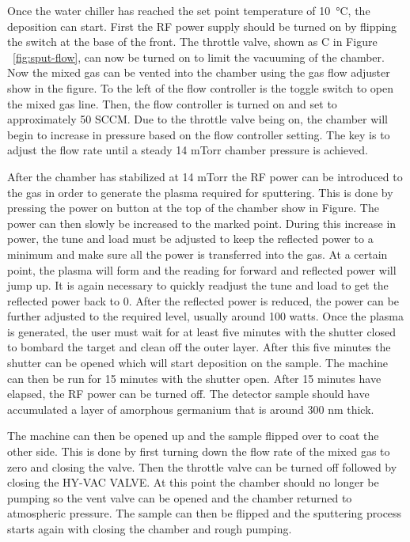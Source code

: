 Once the water chiller has reached the set point temperature of \SI{10}{\celsius}, the deposition can start.
First the RF power supply should be turned on by flipping the switch at the base of the front.
The throttle valve, shown as C in Figure ~\ref{fig:sput-flow}, can now be turned on to limit the vacuuming of the chamber.
Now the mixed gas can be vented into the chamber using the gas flow adjuster show in the figure.
To the left of the flow controller is the toggle switch to open the mixed gas line.
Then, the flow controller is turned on and set to approximately 50 SCCM.
Due to the throttle valve being on, the chamber will begin to increase in pressure based on the flow controller setting.
The key is to adjust the flow rate until a steady 14 mTorr chamber pressure is achieved.

After the chamber has stabilized at 14 mTorr the RF power can be introduced to the gas in order to generate the plasma required for sputtering.
This is done by pressing the power on button at the top of the chamber show in Figure.
The power can then slowly be increased to the marked point.
During this increase in power, the tune and load must be adjusted to keep the reflected power to a minimum and make sure all the power is transferred into the gas.
At a certain point, the plasma will form and the reading for forward and reflected power will jump up.
It is again necessary to quickly readjust the tune and load to get the reflected power back to 0.
After the reflected power is reduced, the power can be further adjusted to the required level, usually around 100 watts.
Once the plasma is generated, the user must wait for at least five minutes with the shutter closed to bombard the target and clean off the outer layer.
After this five minutes the shutter can be opened which will start deposition on the sample.
The machine can then be run for 15 minutes with the shutter open.
After 15 minutes have elapsed, the RF power can be turned off.
The detector sample should have accumulated a layer of amorphous germanium that is around 300 nm thick.

The machine can then be opened up and the sample flipped over to coat the other side.
This is done by first turning down the flow rate of the mixed gas to zero and closing the valve.
Then the throttle valve can be turned off followed by closing the HY-VAC VALVE.
At this point the chamber should no longer be pumping so the vent valve can be opened and the chamber returned to atmospheric pressure.
The sample can then be flipped and the sputtering process starts again with closing the chamber and rough pumping.

